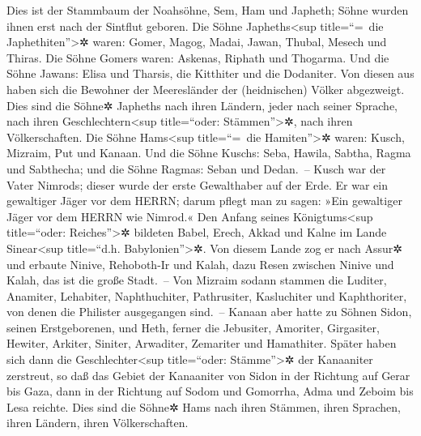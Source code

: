  Dies ist der Stammbaum der Noahsöhne, Sem, Ham und
Japheth; Söhne wurden ihnen erst nach der Sintflut geboren.
 Die Söhne Japheths\textless sup title=``=~die
Japhethiten''\textgreater✲ waren: Gomer, Magog, Madai, Jawan, Thubal,
Mesech und Thiras.  Die Söhne Gomers waren: Askenas,
Riphath und Thogarma.  Und die Söhne Jawans: Elisa und
Tharsis, die Kitthiter und die Dodaniter.  Von diesen aus
haben sich die Bewohner der Meeresländer der (heidnischen) Völker
abgezweigt. Dies sind die Söhne✲ Japheths nach ihren Ländern, jeder nach
seiner Sprache, nach ihren Geschlechtern\textless sup title=``oder:
Stämmen''\textgreater✲, nach ihren Völkerschaften.  Die
Söhne Hams\textless sup title=``=~die Hamiten''\textgreater✲ waren:
Kusch, Mizraim, Put und Kanaan.  Und die Söhne Kuschs:
Seba, Hawila, Sabtha, Ragma und Sabthecha; und die Söhne Ragmas: Seban
und Dedan.~--  Kusch war der Vater Nimrods; dieser wurde
der erste Gewalthaber auf der Erde.  Er war ein gewaltiger
Jäger vor dem HERRN; darum pflegt man zu sagen: »Ein gewaltiger Jäger
vor dem HERRN wie Nimrod.«  Den Anfang seines
Königtums\textless sup title=``oder: Reiches''\textgreater✲ bildeten
Babel, Erech, Akkad und Kalne im Lande Sinear\textless sup title=``d.h.
Babylonien''\textgreater✲.  Von diesem Lande zog er nach
Assur✲ und erbaute Ninive, Rehoboth-Ir und Kalah,  dazu
Resen zwischen Ninive und Kalah, das ist die große Stadt.~--
 Von Mizraim sodann stammen die Luditer, Anamiter,
Lehabiter, Naphthuchiter,  Pathrusiter, Kasluchiter und
Kaphthoriter, von denen die Philister ausgegangen sind.~--
 Kanaan aber hatte zu Söhnen Sidon, seinen Erstgeborenen,
und Heth,  ferner die Jebusiter, Amoriter, Girgasiter,
 Hewiter, Arkiter, Siniter,  Arwaditer,
Zemariter und Hamathiter. Später haben sich dann die
Geschlechter\textless sup title=``oder: Stämme''\textgreater✲ der
Kanaaniter zerstreut,  so daß das Gebiet der Kanaaniter
von Sidon in der Richtung auf Gerar bis Gaza, dann in der Richtung auf
Sodom und Gomorrha, Adma und Zeboim bis Lesa reichte. 
Dies sind die Söhne✲ Hams nach ihren Stämmen, ihren Sprachen, ihren
Ländern, ihren Völkerschaften.

